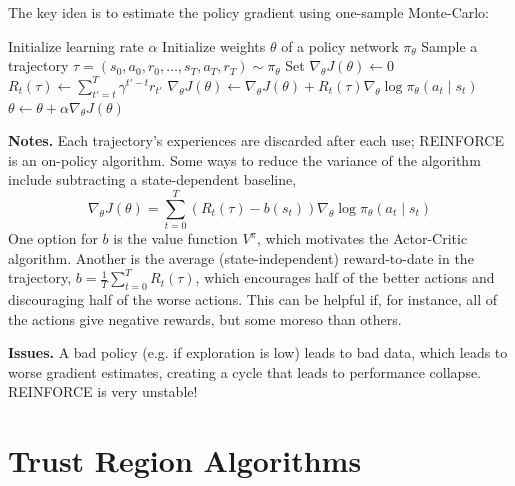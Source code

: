 \documentclass[11pt, letterpaper]{article}
\begin{document}
\begin{concept}
    The key idea is to estimate the policy gradient using one-sample Monte-Carlo:
    \begin{algorithm}[H]
    \caption*{REINFORCE Algorithm}
    \begin{algorithmic}[1]
    \State Initialize learning rate \(\alpha\)
    \State Initialize weights \(\theta\) of a policy network \(\pi_\theta\)
        \State Sample a trajectory \(\tau = (s_0, a_0, r_0, \dots, s_T, a_T, r_T) \sim \pi_\theta\)
        \State Set \(\nabla_\theta J(\theta) \leftarrow 0\)
            \State \(R_t(\tau) \leftarrow \sum_{t'=t}^T \gamma^{t'-t} r_{t'}\)
            \State \(\nabla_\theta J(\theta) \leftarrow \nabla_\theta J(\theta) + R_t(\tau) \nabla_\theta \log \pi_\theta(a_t \mid s_t)\)
        \EndFor
        \State \(\theta \leftarrow \theta + \alpha \nabla_\theta J(\theta)\)
    \EndFor
    \end{algorithmic}
    \end{algorithm}
\end{concept}

\begin{remark}
    \textbf{Notes.} Each trajectory's experiences are discarded after each use; REINFORCE is an on-policy algorithm. Some ways to reduce the variance of the algorithm include subtracting a state-dependent baseline, 
    \[
        \nabla_\theta J(\theta) = \sum_{t=0}^T (R_t(\tau) - b(s_t)) \nabla_\theta \log \pi_\theta(a_t \mid s_t)
    \]
    One option for \(b\) is the value function \(V^\pi\), which motivates the Actor-Critic algorithm. Another is the average (state-independent) reward-to-date in the trajectory, \(b = \frac{1}{T} \sum_{t=0}^T R_t(\tau)\), which encourages half of the better actions and discouraging half of the worse actions. This can be helpful if, for instance, all of the actions give negative rewards, but some moreso than others.

    \textbf{Issues.} A bad policy (e.g. if exploration is low) leads to bad data, which leads to worse gradient estimates, creating a cycle that leads to performance collapse. REINFORCE is very unstable! 
\end{remark}

\section{Trust Region Algorithms}
\end{document}
